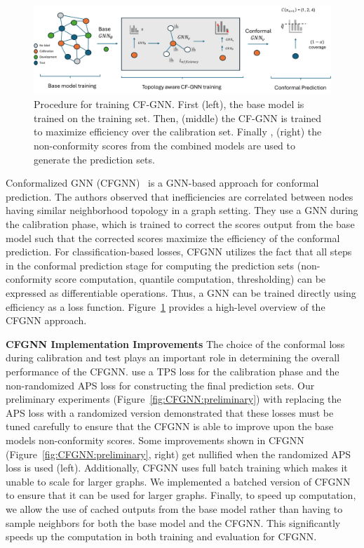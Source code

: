 \begin{figure}
    \centering
    \includegraphics[width=\linewidth]{graphConformal/figures/CFGNN.pdf}
    \caption{Procedure for training CF-GNN. First (left), the base model is trained on the training set. Then, (middle) the CF-GNN is trained to maximize efficiency over the calibration set. Finally , (right) the non-conformity scores from the combined models are used to generate the prediction sets.}
    \label{fig:conformalized_gnn}
\end{figure}

Conformalized GNN (CFGNN)~\citep{huang2024uncertainty} is a GNN-based approach for conformal prediction.
The authors observed that inefficiencies are correlated between nodes having similar neighborhood topology in a graph setting.
They use a GNN during the calibration phase, which is trained to correct the scores output from the base model such that the corrected scores maximize the efficiency of the conformal prediction.
For classification-based losses, CFGNN utilizes the fact that all steps in the conformal prediction stage for computing the prediction sets (non-conformity score computation, quantile computation, thresholding) can be expressed as differentiable operations.
Thus, a GNN can be trained directly using efficiency as a loss function.
Figure~\ref{fig:conformalized_gnn} provides a high-level overview of the CFGNN approach.

\noindent \textbf{CFGNN Implementation Improvements}
The choice of the conformal loss during calibration and test plays an important role in determining the overall performance of the CFGNN.
\citet{huang2024uncertainty} use a TPS loss for the calibration phase and the non-randomized APS loss for constructing the final prediction sets.
Our preliminary experiments (Figure~\ref{fig:CFGNN:preliminary}) with replacing the APS loss with a randomized version demonstrated that these losses must be tuned carefully to ensure that the CFGNN is able to improve upon the base models non-conformity scores.
Some improvements shown in CFGNN (Figure~\ref{fig:CFGNN:preliminary}, right) get nullified when the randomized APS loss is used (left).
Additionally, CFGNN uses full batch training which makes it unable to scale for larger graphs.
We implemented a batched version of CFGNN to ensure that it can be used for larger graphs.
Finally, to speed up computation, we allow the use of cached outputs from the base model rather than having to sample neighbors for both the base model and the CFGNN. 
This significantly speeds up the computation in both training and evaluation for CFGNN.

